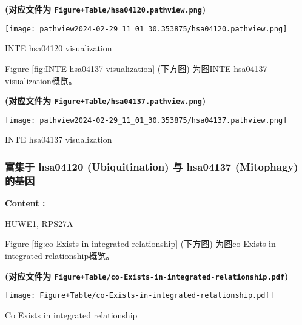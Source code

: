 \documentclass[
]{article}
\begin{document}
\textbf{(对应文件为 \texttt{Figure+Table/hsa04120.pathview.png})}

\def\@captype{figure}
\begin{center}
\texttt{[image: pathview2024-02-29\_11\_01\_30.353875/hsa04120.pathview.png]}
\caption{INTE hsa04120 visualization}\label{fig:INTE-hsa04120-visualization}
\end{center}

Figure \ref{fig:INTE-hsa04137-visualization} (下方图) 为图INTE hsa04137 visualization概览。

\textbf{(对应文件为 \texttt{Figure+Table/hsa04137.pathview.png})}

\def\@captype{figure}
\begin{center}
\texttt{[image: pathview2024-02-29\_11\_01\_30.353875/hsa04137.pathview.png]}
\caption{INTE hsa04137 visualization}\label{fig:INTE-hsa04137-visualization}
\end{center}

\hypertarget{path-intersect}{%
\subsubsection{富集于 hsa04120 (Ubiquitination) 与 hsa04137 (Mitophagy) 的基因}\label{path-intersect}}

\begin{center}\begin{tcolorbox}[colback=gray!10, colframe=gray!50, width=0.9\linewidth, arc=1mm, boxrule=0.5pt]
\textbf{
Content
:}

\vspace{0.5em}

    HUWE1, RPS27A

\vspace{2em}
\end{tcolorbox}
\end{center}

Figure \ref{fig:co-Exists-in-integrated-relationship} (下方图) 为图co Exists in integrated relationship概览。

\textbf{(对应文件为 \texttt{Figure+Table/co-Exists-in-integrated-relationship.pdf})}

\def\@captype{figure}
\begin{center}
\texttt{[image: Figure+Table/co-Exists-in-integrated-relationship.pdf]}
\caption{Co Exists in integrated relationship}\label{fig:co-Exists-in-integrated-relationship}
\end{center}
\end{document}
